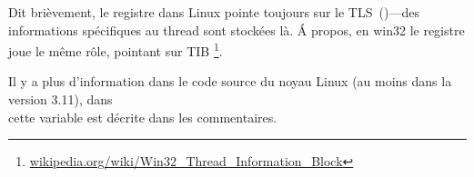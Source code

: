 Dit brièvement, le registre  dans Linux pointe toujours sur le
\ac{TLS}~()---des informations spécifiques au thread sont stockées là.
Á propos, en win32 le registre  joue le même rôle, pointant sur \ac{TIB}
\footnote{\href{http://go.yurichev.com/17104}{wikipedia.org/wiki/Win32\_Thread\_Information\_Block}}.

Il y a plus d'information dans le code source du noyau Linux (au moins dans la version 3.11),
dans\\
 cette variable est décrite dans les commentaires.



